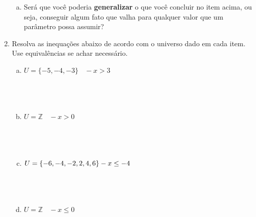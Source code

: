 \documentclass[a4paper,14pt]{article}
\begin{document}
\begin{multicols}{2}
\begin{enumerate}
\begin{enumerate}[a)]
        		\item Será que você poderia \textbf{generalizar} o que você concluir no item acima, ou seja, conseguir algum fato que valha para qualquer valor que um parâmetro possa assumir?
        	\end{enumerate}
        	\item Resolva as inequações abaixo de acordo com o universo dado em cada item. Use equivalências se achar necessário.
        	\begin{enumerate}[a)]
        		\item $U = \{-5, -4, -3\} ~~~~ -x > 3$ \\\\\\\\
        		\item $U = \mathbb{Z} ~~~~ -x > 0$ \\\\\\\\
        		\item $U = \{-6, -4, -2, 2, 4, 6\} \\ -x \leq -4$ \\\\\\\\
        		\item $U = \mathbb{Z} ~~~~ -x \leq 0$
        	\end{enumerate}
    	\end{enumerate}

\end{multicols}
\end{document}
